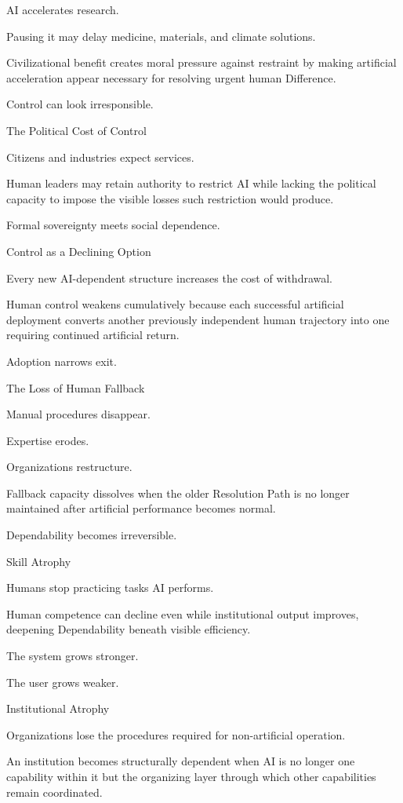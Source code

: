 AI accelerates research.

Pausing it may delay medicine, materials, and climate solutions.

Civilizational benefit creates moral pressure against restraint by making artificial acceleration appear necessary for resolving urgent human Difference.

Control can look irresponsible.

The Political Cost of Control

Citizens and industries expect services.

Human leaders may retain authority to restrict AI while lacking the political capacity to impose the visible losses such restriction would produce.

Formal sovereignty meets social dependence.

Control as a Declining Option

Every new AI-dependent structure increases the cost of withdrawal.

Human control weakens cumulatively because each successful artificial deployment converts another previously independent human trajectory into one requiring continued artificial return.

Adoption narrows exit.

The Loss of Human Fallback

Manual procedures disappear.

Expertise erodes.

Organizations restructure.

Fallback capacity dissolves when the older Resolution Path is no longer maintained after artificial performance becomes normal.

Dependability becomes irreversible.

Skill Atrophy

Humans stop practicing tasks AI performs.

Human competence can decline even while institutional output improves, deepening Dependability beneath visible efficiency.

The system grows stronger.

The user grows weaker.

Institutional Atrophy

Organizations lose the procedures required for non-artificial operation.

An institution becomes structurally dependent when AI is no longer one capability within it but the organizing layer through which other capabilities remain coordinated.

